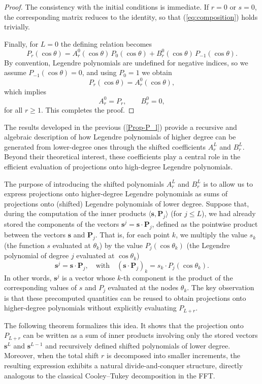 \documentclass[11pt]{article}
\renewcommand\eqref[1]{(\ref{#1})} %
\theoremstyle{definition}
\theoremstyle{remark}
\numberwithin{equation}{section}
\begin{document}
\begin{proof}
The consistency with the initial conditions is immediate. If $r=0$ or $s=0$, the
corresponding matrix reduces to the identity, so that \eqref{eq:composition}
holds trivially.

Finally, for $L=0$ the defining relation becomes
\[
P_r(\cos\theta)
= A_r^0(\cos\theta)\, P_0(\cos\theta)
+ B_r^0(\cos\theta)\, P_{-1}(\cos\theta).
\]
By convention, Legendre polynomials are undefined for negative indices, so we assume $P_{-1}(\cos\theta) = 0$, and using $P_0=1$ we obtain
\[
P_r(\cos\theta) = A_r^0(\cos\theta),
\]
which implies
\[
A_r^0 = P_r, \qquad B_r^0 = 0,
\]
for all $r \ge 1$. This completes the proof.
\end{proof}

The results developed in the previous \eqref{Prop-P_l} provide a recursive and algebraic
description of how Legendre polynomials of higher degree can be generated from
lower-degree ones through the shifted coefficients $A_r^L$ and $B_r^L$.
Beyond their theoretical interest, these coefficients play a central role in the
efficient evaluation of projections onto high-degree Legendre polynomials.


The purpose of introducing the shifted polynomials $A_r^L$ and $B_r^L$ is to allow us to express projections onto higher-degree Legendre polynomials as sums of projections onto (shifted) Legendre polynomials of lower degree. Suppose that, during the computation of the inner products $\langle \mathbf{s}, \mathbf{P}_j \rangle$ (for $j \leq L$), we had already stored the components of the vectors $\mathbf{s}^j = \mathbf{s} \cdot \mathbf{P}_j$, defined as the pointwise product between the vectors $\mathbf{s}$ and $\mathbf{P}_j$. That is, for each point $k$, we multiply the value $s_k$ (the function $s$ evaluated at $\theta_k$) by the value $P_j(\cos\theta_k)$ (the Legendre polynomial of degree $j$ evaluated at $\cos\theta_k$)
\[
\mathbf{s}^j = \mathbf{s} \cdot \mathbf{P}_j, \quad \text{with} \quad (\mathbf{s} \cdot \mathbf{P}_j)_k = s_k \cdot P_j(\cos\theta_k).\]
In other words, $\mathbf{s}^j$ is a vector whose $k$-th component is the product of the corresponding values of $s$ and $P_j$ evaluated at the nodes $\theta_k$. The key observation is that these precomputed quantities can be reused to obtain
projections onto higher-degree polynomials without explicitly evaluating
$P_{L+r}$.

The following theorem formalizes this idea.
It shows that the projection onto $P_{L+r}$ can be written as a sum of inner
products involving only the stored vectors $\mathbf{s}^L$ and
$\mathbf{s}^{L-1}$ and recursively defined shifted polynomials of lower degree.
Moreover, when the total shift $r$ is decomposed into smaller increments, the
resulting expression exhibits a natural divide-and-conquer structure, directly
analogous to the classical Cooley--Tukey decomposition in the FFT.
\end{document}
